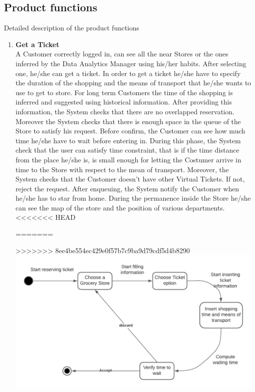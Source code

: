 \documentclass[a4paper, 12pt, oneside]{article}
\begin{document}
\subsection{Product functions}
Detailed description of the product functions

\begin{enumerate}
    \item \textbf{Get a Ticket} 
    \\
    A Customer correctly logged in, can see all the near Stores or the ones inferred by the Data Analytics Manager using his/her habits. After selecting one, he/she can get a ticket. In order to get a ticket he/she have to specify the duration of the shopping and the means of transport that he/she wants to use to get to store. For long term Customers the time of the shopping is inferred and suggested using historical information.
        After providing this information, the System checks that there are no overlapped reservation. Moreover the System checks that there is enough space in the queue of the Store to satisfy his request.
        Before confirm, the Customer can see how much time he/she have to wait before entering in. During this phase, the System check that the user can satisfy time constraint, that is if the time distance from the place he/she is, is small enough for letting the Costumer arrive in time to the Store with respect to the mean of transport. Moreover, the System checks that the Customer doesn't have other Virtual Tickets. If not, reject the request.
        After enqueuing, the System notify the Customer when he/she has to star from home.
        During the permanence inside the Store he/she can see the map of the store and the position of various departments.
     \\
<<<<<<< HEAD
        \begin{minipage}{\linewidth}
=======
       	\begin{minipage}{\linewidth}
>>>>>>> 8ee4be554ec429e0f57b7c9ba9d79cdf5d4b8290
            \centering
           \includegraphics[height=0.3\textheight, scale=0.2, keepaspectratio]{img/Get_Ticket_diagram.png}
        \end{minipage}
    

\end{minipage}
\end{enumerate}
\end{document}
